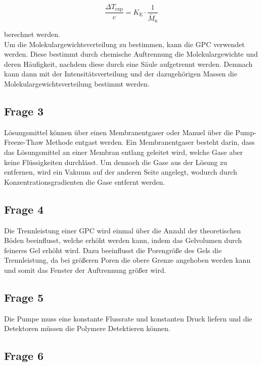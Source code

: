\documentclass[10pt,a4paper,ngerman]{scrartcl}
\begin{document}
		\begin{equation}
			\frac{\Delta T_\text{exp}}{c} = K_\text{E} \cdot \frac{1}{\bar{M}_\text{n}}
		\end{equation}

		berechnet werden. \cite{Ludwigs2025}\\
		Um die Molekulargewichtsverteilung zu bestimmen, kann die GPC verwendet werden. Diese bestimmt durch chemische Auftrennung die 
		Molekulargewichte und deren Häufigkeit, nachdem diese durch eine Säule aufgetrennt werden. Demnach kann dann mit der Intensitätsverteilung 
		und der dazugehörigen Massen die Molekulargewichtsverteilung bestimmt werden. \cite{polyskript}
	\subsection{Frage 3}

		Lösungsmittel können über einen Membranentgaser oder Manuel über die Pump-Freeze-Thaw Methode entgast werden. Ein Membranentgaser besteht 
		darin, dass das Lösungsmittel an einer Membran entlang geleitet wird, welche Gase aber keine Flüssigkeiten durchlässt. Um dennoch die Gase 
		aus der Lösung zu entfernen, wird ein Vakuum auf der anderen Seite angelegt, wodurch durch Konzentrationsgradienten die Gase entfernt werden. 

	\subsection{Frage 4}

		Die Trennleistung einer GPC wird einmal über die Anzahl der theoretischen Böden beeinflusst, welche erhöht werden kann, indem das 
		Gelvolumen durch feineres Gel erhöht wird. Dazu beeinflusst die Porengröße des Gels die Trennleistung, da bei größeren Poren die obere 
		Grenze angehoben werden kann und somit das Fenster der Auftrennung größer wird. \cite{polyskript}

	\subsection{Frage 5}

		Die Pumpe muss eine konstante Flussrate und konstanten Druck liefern und die Detektoren müssen die Polymere Detektieren können.  \cite{polyskript}

	\subsection{Frage 6}
\end{document}
